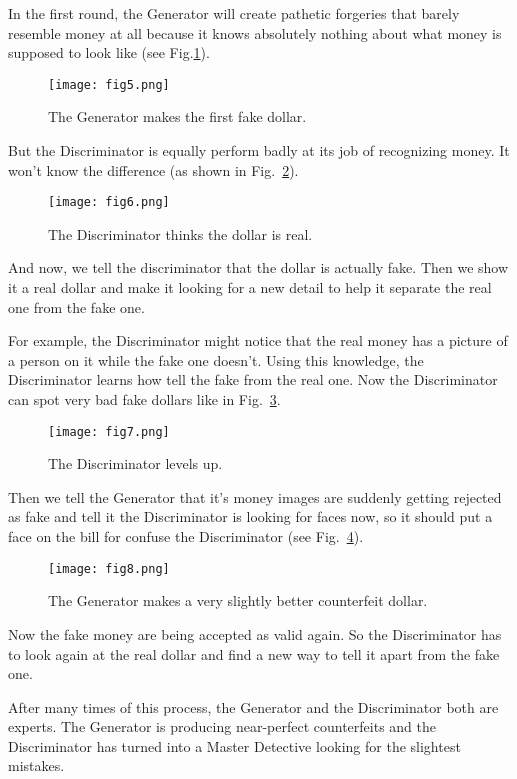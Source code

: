 \documentclass[10pt,twocolumn,letterpaper]{article}
\begin{document}
	\par
	In the first round, the Generator will create pathetic forgeries that barely resemble money at all because it knows absolutely nothing about what money is supposed to look like (see Fig.\ref{first}).
	\begin{figure}[h]
		\centering
		\texttt{[image: fig5.png]}
		\caption{The Generator makes the first fake dollar.} \label{first}
	\end{figure}
	\par
	But the Discriminator is equally perform badly at its job of recognizing money. It won't know the difference (as shown in Fig.~\ref{fig6}).
	\begin{figure}[h]
		\centering
		\texttt{[image: fig6.png]}
		\caption{The Discriminator thinks the dollar is real.} \label{fig6}
	\end{figure}
	\par
	And now, we tell the discriminator that the dollar is actually fake. Then we show it a real dollar and make it looking for a new detail to help it separate the real one from the fake one. 
	\par
	For example, the Discriminator might notice that the real money has a picture of a person on it while the fake one doesn't. Using this knowledge, the Discriminator learns how tell the fake from the real one. Now the Discriminator can spot very bad fake dollars like in Fig.~\ref{fig7}.
	\begin{figure}[h]
		\centering
		\texttt{[image: fig7.png]}
		\caption{The Discriminator levels up.} \label{fig7}
	\end{figure}
	\par
	Then we tell the Generator that it's money images are suddenly getting rejected as fake and tell it the Discriminator is looking for faces now, so it should put a face on the bill for confuse the Discriminator (see Fig.~\ref{fig8}).
	\begin{figure}[h]
		\centering
		\texttt{[image: fig8.png]}
		\caption{The Generator makes a very slightly better counterfeit dollar.} \label{fig8}
	\end{figure}
	\par
	Now the fake money are being accepted as valid again. So the Discriminator has to look again at the real dollar and find a new way to tell it apart from the fake one. 
	\par
	After many times of this process, the Generator and the Discriminator both are experts. The Generator is producing near-perfect counterfeits and the Discriminator has turned into a Master Detective looking for the slightest mistakes.
\end{document}
